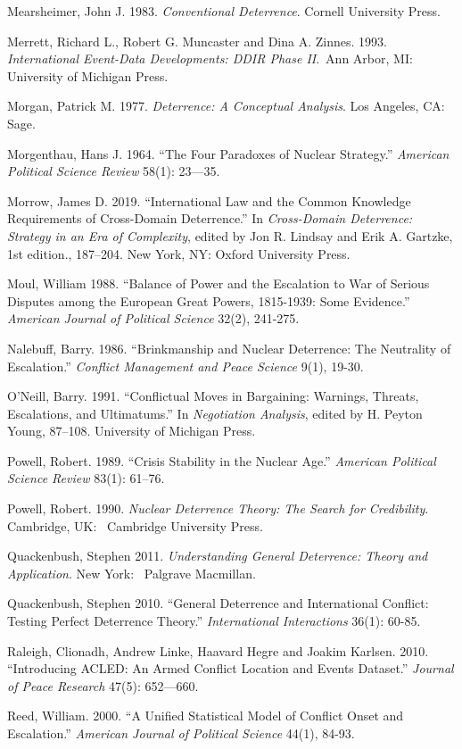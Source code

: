 \documentclass[
  letterpaper,
  DIV=11,
  numbers=noendperiod]{scrartcl}
\begin{document}
Mearsheimer, John J. 1983. \emph{Conventional Deterrence}. Cornell
University Press.

Merrett, Richard L., Robert G. Muncaster and Dina A. Zinnes. 1993.
\emph{International Event-Data Developments: DDIR Phase II}.~Ann Arbor,
MI: University of Michigan Press.

Morgan, Patrick M. 1977. \emph{Deterrence: A Conceptual Analysis}. Los
Angeles, CA: Sage.

Morgenthau, Hans J. 1964. ``The Four Paradoxes of Nuclear Strategy.''
\emph{American Political Science Review} 58(1): 23---35.

Morrow, James D. 2019. ``International Law and the Common Knowledge
Requirements of Cross-Domain Deterrence.'' In \emph{Cross-Domain
Deterrence: Strategy in an Era of Complexity}, edited by Jon R. Lindsay
and Erik A. Gartzke, 1st edition., 187--204. New York, NY: Oxford
University Press.

Moul, William 1988. ``Balance of Power and the Escalation to War of
Serious Disputes among the European Great Powers, 1815-1939: Some
Evidence.'' \emph{American Journal of Political Science} 32(2), 241-275.

Nalebuff, Barry. 1986. ``Brinkmanship and Nuclear Deterrence: The
Neutrality of Escalation.'' \emph{Conflict Management and Peace Science}
9(1), 19-30.

O'Neill, Barry. 1991. ``Conflictual Moves in Bargaining: Warnings,
Threats, Escalations, and Ultimatums.'' In \emph{Negotiation Analysis},
edited by H. Peyton Young, 87--108. University of Michigan Press.

Powell, Robert. 1989. ``Crisis Stability in the Nuclear Age.''
\emph{American Political Science Review} 83(1): 61--76.

Powell, Robert. 1990. \emph{Nuclear Deterrence Theory: The Search for
Credibility}. Cambridge, UK:~ Cambridge University Press.

Quackenbush, Stephen 2011. \emph{Understanding General Deterrence:
Theory and Application}. New York:~ Palgrave Macmillan.~

Quackenbush, Stephen 2010. ``General Deterrence and International
Conflict: Testing Perfect Deterrence Theory.'' \emph{International
Interactions} 36(1): 60-85.

Raleigh, Clionadh, Andrew Linke, Haavard Hegre and Joakim Karlsen. 2010.
``Introducing ACLED: An Armed Conflict Location and Events Dataset.''
\emph{Journal of Peace Research} 47(5): 652---660.

Reed, William. 2000. ``A Unified Statistical Model of Conflict Onset and
Escalation.'' \emph{American Journal of Political Science} 44(1), 84-93.
\end{document}
